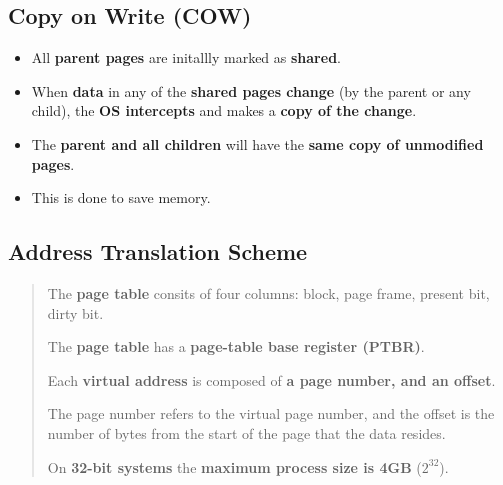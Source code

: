 \documentclass{article}
\begin{document}
    \subsection*{Copy on Write (COW)}
    \begin{itemize}
        \item All \textbf{parent pages} are initallly marked as \textbf{shared}.
        \item When \textbf{data} in any of the \textbf{shared pages change} (by the parent or any child), the \textbf{OS intercepts} and makes a \textbf{copy of the change}.
        \item The \textbf{parent and all children} will have the \textbf{same copy of unmodified pages}.
        \item This is done to save memory.
    \end{itemize}

    \subsection*{Address Translation Scheme}
    \begin{abstract}
        \item The \textbf{page table} consits of four columns: block, page frame, present bit, dirty bit.
        \item The \textbf{page table} has a \textbf{page-table base register (PTBR)}.
        \item Each \textbf{virtual address} is composed of \textbf{a page number, and an offset}.
        \item The page number refers to the virtual page number, and the offset is the number of bytes from the start of the page that the data resides.
        \item On \textbf{32-bit systems} the \textbf{maximum process size is 4GB} ($2^{32}$).
    \end{abstract}
\end{document}
